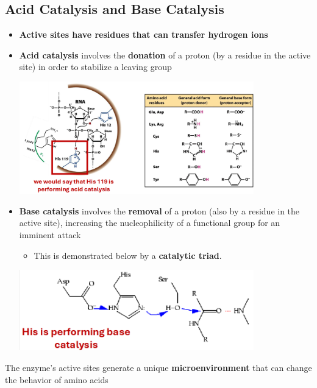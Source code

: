 \documentclass[10pt]{article}
\begin{document}
\subsection*{Acid Catalysis and Base Catalysis}
\begin{itemize}
    \item \textbf{Active sites have residues that can transfer hydrogen ions}
    \item \textbf{Acid catalysis} involves the \textbf{donation} of a proton (by a residue in the active site) in order to stabilize a leaving group
    \begin{center}
        \includegraphics*[width=0.8\textwidth]{L2_12.png} 
    \end{center}
    \item \textbf{Base catalysis} involves the \textbf{removal} of a proton (also by a residue in the active site), increasing the nucleophilicity of a functional group for an imminent attack
    \begin{itemize}
        \item This is demonstrated below by a \textbf{catalytic triad}.
    \end{itemize}
    \begin{center}
        \includegraphics*[width=0.8\textwidth]{L2_13.png} 
    \end{center}
\end{itemize}
The enzyme's active sites generate a unique \textbf{microenvironment} that can change the behavior of amino acids
\end{document}
